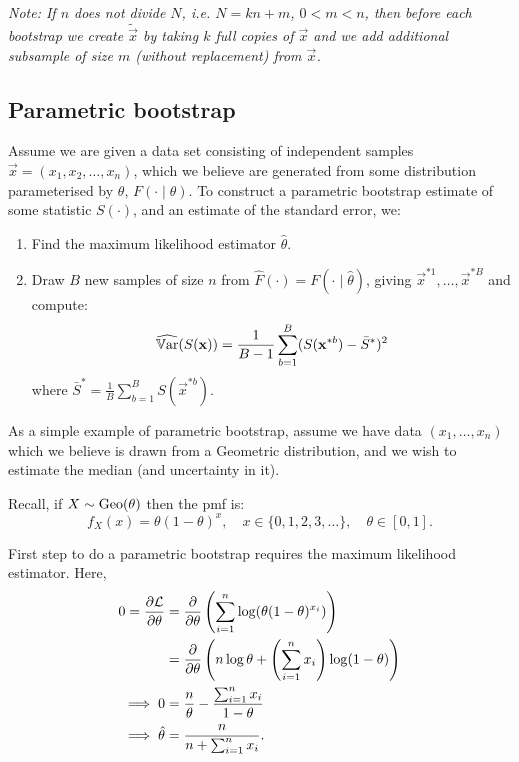 \documentclass[10pt, a4paper]{article}
\begin{document}
\textit{Note:
If $n$ does not divide $N$,
i.e. $N = kn + m$,
$0 < m < n$,
then before each bootstrap we create $\tilde{\vec{x}}$ by taking $k$ full copies of $\vec{x}$ and we add additional subsample of size $m$
(without replacement)
from $\vec{x}$.}

\subsection{Parametric bootstrap}
\begin{definition}
    Assume we are given a data set consisting of independent samples $\vec{x} = (x_1, x_2, \dotsc, x_n)$,
    which we believe are generated from some distribution parameterised by $\theta$,
    $F(\cdot \mid \theta)$.
    To construct a parametric bootstrap estimate of some statistic $S(\cdot)$,
    and an estimate of the standard error,
    we:
    \begin{enumerate}[label = (\roman*)]
        \item Find the maximum likelihood estimator $\hat{\theta}$.

        \item Draw $B$ new samples of size $n$ from $\hat{F}(\cdot) = F(\cdot \mid \hat{\theta})$,
        giving $\vec{x} ^ {*1}, \dotsc, \vec{x} ^ {*B}$ and compute:
        \[
        \widehat{\Var}(S(\vec{x})) = \frac{1}{B - 1}\sum_{b = 1}^{B}(S(\vec{x} ^ {*b}) - \bar{S} ^ {*}) ^ 2
        \]
        where $\bar{S} ^ {*} = \frac{1}{B}\sum_{b = 1}^{B}S(\vec{x} ^ {*b})$.
    \end{enumerate}
\end{definition}

\begin{example}
    As a simple example of parametric bootstrap,
    assume we have data $(x_1, \dotsc, x_n)$ which we believe is drawn from a Geometric distribution,
    and we wish to estimate the median
    (and uncertainty in it).

    Recall,
    if $X \sim \Geo(\theta)$ then the pmf is:
    \[
    f_{X}(x) = \theta(1 - \theta) ^ x,\quad x \in \{0, 1, 2, 3, \dotsc\}, \quad \theta \in [0, 1].
    \]

    First step to do a parametric bootstrap requires the maximum likelihood estimator.
    Here,
    \begin{align*}
        0 = \pd[\mathcal{L}]{\theta} &= \pd{\theta}\left(\sum_{i = 1}^{n}\log(\theta(1 - \theta) ^ {x_i})\right) \\
        &= \pd{\theta}\left(n\log{\theta} + \left(\sum_{i = 1}^{n}x_i\right)\log(1 - \theta)\right) \\
        \implies 0 &= \frac{n}{\theta} - \frac{\sum_{i = 1}^{n}x_i}{1 - \theta} \\
        \implies \hat{\theta} &= \frac{n}{n + \sum_{i = 1}^{n}x_i}.
    \end{align*}
\end{example}
\end{document}

